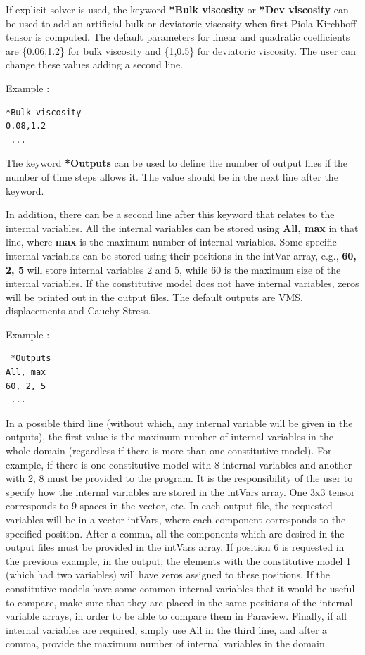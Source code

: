 \documentclass[oneside,11pt,times]{book}
\begin{document}
If explicit solver is used, the keyword \textbf{*Bulk viscosity} or \textbf{*Dev viscosity} can be used to add an artificial bulk or deviatoric viscosity when first Piola-Kirchhoff tensor is computed. The default parameters for linear and quadratic coefficients are \{0.06,1.2\} for bulk viscosity and \{1,0.5\} for deviatoric viscosity. The user can change these values adding a second line.

Example :
\begin{lstlisting}
*Bulk viscosity
0.08,1.2
 ...
\end{lstlisting}

The keyword \textbf{*Outputs} can be used to define the number of output files if the number of time steps allows it. The value should be in the next line after the keyword.

In addition, there can be a second line after this keyword that relates to the internal variables. All the internal variables can be stored using \textbf{All, max} in that line, where \textbf{max} is the maximum number of internal variables. Some specific internal variables can be stored using their positions in the intVar array, e.g.,  \textbf{60, 2, 5} will store internal variables 2 and 5, while 60 is the maximum size of the internal variables. If the constitutive model does not have internal variables, zeros will be printed out in the output files. The default outputs are VMS, displacements and Cauchy Stress.

Example :

\begin{lstlisting}
 *Outputs
All, max
60, 2, 5
 ...
\end{lstlisting}

In a possible third line (without which, any internal variable will be given in the outputs), the first value is the maximum number of internal variables in the whole domain (regardless if there is more than one constitutive model). For example, if there is one constitutive model with 8 internal variables and another with 2, 8 must be provided to the program. It is the responsibility of the user to specify how the internal variables are stored in the intVars array. One 3x3 tensor corresponds to 9 spaces in the vector, etc. In each output file, the requested variables will be in a vector intVars, where each component corresponds to the specified position. After a comma, all the components which are desired in the output files must be provided in the intVars array. If position 6 is requested in the previous example, in the output, the elements with the constitutive model 1 (which had two variables) will have zeros assigned to these positions. If the constitutive models have some common internal variables that it would be useful to compare, make sure that they are placed in the same positions of the internal variable arrays, in order to be able to compare them in Paraview. Finally, if all internal variables are required, simply use All in the third line, and after a comma, provide the maximum number of internal variables in the domain.\\
\end{document}
